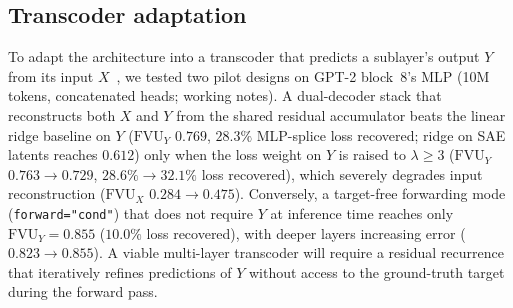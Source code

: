 \subsection{Transcoder adaptation}
To adapt the architecture into a transcoder that predicts a sublayer's
output $Y$ from its input $X$~\cite{dunefsky2024}, we tested two pilot
designs on GPT-2 block~8's MLP (10M tokens, concatenated heads; working
notes). A dual-decoder stack that reconstructs both $X$ and $Y$ from the
shared residual accumulator beats the linear ridge baseline on $Y$
($\mathrm{FVU}_Y$ $0.769$, $28.3\%$ MLP-splice loss recovered; ridge on
SAE latents reaches $0.612$) only when the loss weight on $Y$ is raised
to $\lambda \ge 3$ ($\mathrm{FVU}_Y$ $0.763 \to 0.729$, $28.6\% \to
32.1\%$ loss recovered), which severely degrades input reconstruction
($\mathrm{FVU}_X$ $0.284 \to 0.475$). Conversely, a target-free
forwarding mode (\texttt{forward="cond"}) that does not require $Y$ at
inference time reaches only $\mathrm{FVU}_Y = 0.855$ ($10.0\%$ loss
recovered), with deeper layers increasing error ($0.823 \to 0.855$). A
viable multi-layer transcoder will require a residual recurrence that
iteratively refines predictions of $Y$ without access to the ground-truth
target during the forward pass.
